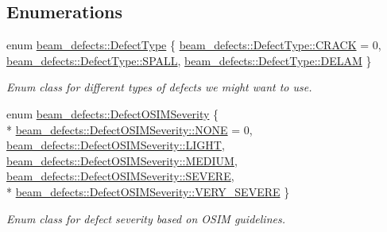 \subsection*{Enumerations}
\begin{DoxyCompactItemize}
\item 
enum \hyperlink{group__defects_gae379b271bd5fb7ce92afe1abee917249}{beam\+\_\+defects\+::\+Defect\+Type} \{ \hyperlink{group__defects_ggae379b271bd5fb7ce92afe1abee917249a2e6d9801a7e8f255fd21bb5c34d946ae}{beam\+\_\+defects\+::\+Defect\+Type\+::\+C\+R\+A\+CK} = 0, 
\hyperlink{group__defects_ggae379b271bd5fb7ce92afe1abee917249a984e578f1440f286e334efcf3917a453}{beam\+\_\+defects\+::\+Defect\+Type\+::\+S\+P\+A\+LL}, 
\hyperlink{group__defects_ggae379b271bd5fb7ce92afe1abee917249ad2a63853778c868ba1eb01a8be651669}{beam\+\_\+defects\+::\+Defect\+Type\+::\+D\+E\+L\+AM}
 \}\begin{DoxyCompactList}\small\item\em Enum class for different types of defects we might want to use. \end{DoxyCompactList}
\item 
enum \hyperlink{group__defects_gaed38c449f8cba57f35d1af04496a0711}{beam\+\_\+defects\+::\+Defect\+O\+S\+I\+M\+Severity} \{ \\*
\hyperlink{group__defects_ggaed38c449f8cba57f35d1af04496a0711ab50339a10e1de285ac99d4c3990b8693}{beam\+\_\+defects\+::\+Defect\+O\+S\+I\+M\+Severity\+::\+N\+O\+NE} = 0, 
\hyperlink{group__defects_ggaed38c449f8cba57f35d1af04496a0711af8589806bbf66241917092b2a6e18c6f}{beam\+\_\+defects\+::\+Defect\+O\+S\+I\+M\+Severity\+::\+L\+I\+G\+HT}, 
\hyperlink{group__defects_ggaed38c449f8cba57f35d1af04496a0711ac87f3be66ffc3c0d4249f1c2cc5f3cce}{beam\+\_\+defects\+::\+Defect\+O\+S\+I\+M\+Severity\+::\+M\+E\+D\+I\+UM}, 
\hyperlink{group__defects_ggaed38c449f8cba57f35d1af04496a0711a47b0e31408d6208bb828e0b8fa50b3ce}{beam\+\_\+defects\+::\+Defect\+O\+S\+I\+M\+Severity\+::\+S\+E\+V\+E\+RE}, 
\\*
\hyperlink{group__defects_ggaed38c449f8cba57f35d1af04496a0711a6e09e99bef75bdd960bfcf7723422b00}{beam\+\_\+defects\+::\+Defect\+O\+S\+I\+M\+Severity\+::\+V\+E\+R\+Y\+\_\+\+S\+E\+V\+E\+RE}
 \}\begin{DoxyCompactList}\small\item\em Enum class for defect severity based on O\+S\+IM guidelines. \end{DoxyCompactList}
\end{DoxyCompactItemize}
